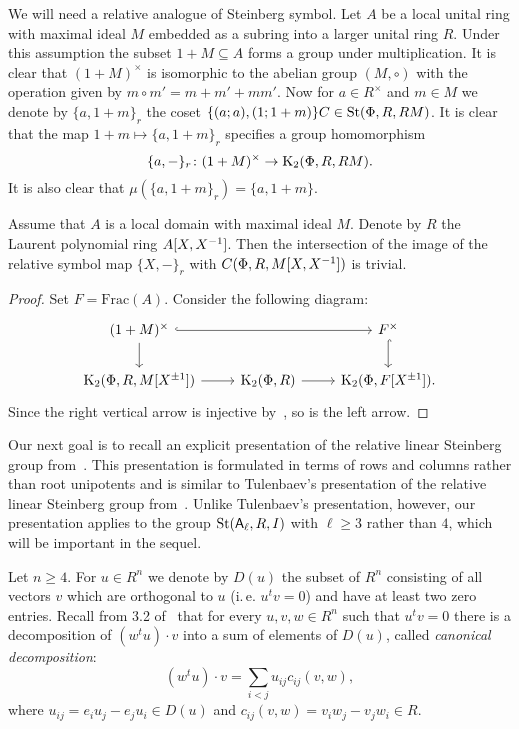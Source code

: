 We will need a relative analogue of Steinberg symbol.
Let $A$ be a local unital ring with maximal ideal $M$ embedded as a subring into a larger unital ring $R$.
Under this assumption the subset $1+M \subseteq A$ forms a group under multiplication.
It is clear that $(1+M)^\times$ is isomorphic to the abelian group $(M, \circ)$ with the operation given by $m \circ m' = m + m' + mm'$.
Now for $a \in R^\times$ and $m \in M$ we denote by $\{a, 1+m\}_r$ the coset $\{(a; a), (1; 1+m)\}C \in \operatorname{St}(\Phi, R, RM)$.
It is clear that the map $1+m \mapsto \{a, 1+m\}_r$ specifies a group homomorphism
\begin{equation} \label{eq:relative-symbol} \{ a, -\}_r \colon (1+M)^\times \to \operatorname{K}_2(\Phi, R, RM). \end{equation}
It is also clear that $\mu(\{a, 1+m\}_r) = \{a, 1+m\}$.

\begin{lemma}\label{lem:symbols}
Assume that $A$ is a local domain with maximal ideal $M$.
Denote by $R$ the Laurent polynomial ring $A[X, X^{-1}]$.
Then the intersection of the image of the relative symbol map $\{X, -\}_r$ with $C(\Phi, R, M[X, X^{-1}])$ is trivial.
\end{lemma}
\begin{proof}
    Set $F = \mathrm{Frac}(A)$.
    Consider the following diagram:
    \[\begin{tikzcd}
    (1+M)^\times \ar[hookrightarrow, rr] \ar[d] &  & F^\times \ar[hookrightarrow, d] \\
    \K_2(\Phi ,R, M[X^{\pm 1}]) \ar[r] & \K_2(\Phi, R) \ar[r] & \K_2(\Phi, F[X^{\pm 1}]).
    \end{tikzcd}\]
    Since the right vertical arrow is injective by~\cite[Lemma~2.2]{LS20}, so is the left arrow.
\end{proof}

Our next goal is to recall an explicit presentation of the relative linear Steinberg group from~\cite{LS17}.
This presentation is formulated in terms of rows and columns rather than root unipotents and is similar to
 Tulenbaev's presentation of the relative linear Steinberg group from~\cite[Definition~1.5]{Tu83}.
Unlike Tulenbaev's presentation, however, our presentation applies to the group $\operatorname{St}(\mathsf{A}_\ell, R, I)$ with $\ell \geq 3$ rather than $4$,
 which will be important in the sequel.

Let $n \geq 4$.
For $u \in R^n$ we denote by $D(u)$ the subset of $R^n$ consisting of all vectors $v$ which are orthogonal to $u$
(i.\,e. $u^{t} v = 0$) and have at least two zero entries.
Recall from 3.2 of~\cite{Ka77} that for every $u, v, w \in R^n$ such that $u^t v = 0$ there
is a decomposition of $(w^t u) \cdot v$ into a sum of elements of $D(u)$, called \textit{canonical decomposition}:
\begin{equation}
    \label{eq:canonical} (w^tu) \cdot v=\sum_{i<j}u_{ij} c_{ij}(v, w),
\end{equation}
where $u_{ij} =e_i u_j-e_j u_i \in D(u)$ and $c_{ij}(v, w) =v_i w_j-v_j w_i \in R$.

